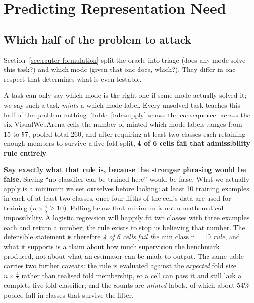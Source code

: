 \chapter{Predicting Representation Need}
\label{ch:pred}


\section{Which half of the problem to attack}
\label{sec:which-half}

Section~\ref{sec:router-formulation} split the oracle into triage (does any mode
solve this task?) and which-mode (given that one does, which?). They differ in
one respect that determines what is even testable.

A task can only say which mode is the right one if some mode actually solved
it; we say such a task \emph{mints} a which-mode label. Every unsolved task
teaches this half of the problem nothing. Table~\ref{tab:supply} shows the
consequence: across the six VisualWebArena cells the number of minted
which-mode labels ranges from 15 to 97, pooled total 260, and after
requiring at least two classes each retaining enough members to survive a
five-fold split, \textbf{4 of 6 cells fail that admissibility rule entirely}.

\begin{scopebox}
\textbf{Say exactly what that rule is, because the stronger phrasing would be
false.} Saying ``no classifier can be trained here'' would be false. What we
actually apply is a minimum we set ourselves before looking: at least 10
training examples in each of at least two classes, once four fifths of the
cell's data are used for training ($n\times\tfrac45 \geq 10$). Falling below
that minimum is not a mathematical impossibility. A logistic regression will
happily fit two classes with three examples each and return a number; the rule
exists to stop us believing that number. The defensible statement is therefore \emph{4 of 6 cells fail the
$\mathrm{min\_class\_n}=10$ rule}, and what it supports is a claim about how much supervision the benchmark produced, not about what an estimator can be made to
output. The same table carries two further caveats: the rule is evaluated against the
\emph{expected} fold size $n\times\tfrac45$ rather than realised fold membership,
so a cell can pass it and still lack a complete five-fold classifier; and the
counts are \emph{minted} labels, of which about 54\% pooled fall in classes that
survive the filter.
\end{scopebox}

